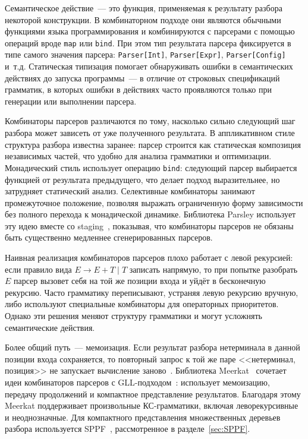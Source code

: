 Семантическое действие~--- это функция, применяемая к результату разбора некоторой конструкции. В комбинаторном подходе они являются обычными функциями языка программирования и комбинируются с парсерами с помощью операций вроде \texttt{map} или \texttt{bind}. При этом тип результата парсера фиксируется в типе самого значения парсера: \texttt{Parser[Int]}, \texttt{Parser[Expr]}, \texttt{Parser[Config]} и~т.д. Статическая типизация помогает обнаруживать ошибки в семантических действиях до запуска программы~--- в отличие от строковых спецификаций грамматик, в которых ошибки в действиях часто проявляются только при генерации или выполнении парсера.

Комбинаторы парсеров различаются по тому, насколько сильно следующий шаг разбора может зависеть от уже полученного результата. В аппликативном стиле структура разбора известна заранее: парсер строится как статическая композиция независимых частей, что удобно для анализа грамматики и оптимизации. Монадический стиль использует операцию \texttt{bind}: следующий парсер выбирается функцией от результата предыдущего, что делает подход выразительнее, но затрудняет статический анализ. Селективные комбинаторы занимают промежуточное положение, позволяя выражать ограниченную форму зависимости без полного перехода к монадической динамике. Библиотека Parsley использует эту идею вместе со staging~, показывая, что комбинаторы парсеров не обязаны быть существенно медленнее сгенерированных парсеров.

Наивная реализация комбинаторов парсеров плохо работает с левой рекурсией: если правило вида $E \to E + T \mid T$ записать напрямую, то при попытке разобрать $E$ парсер вызовет себя на той же позиции входа и уйдёт в бесконечную рекурсию. Часто грамматику переписывают, устраняя левую рекурсию вручную, либо используют специальные комбинаторы для операторных приоритетов. Однако эти решения меняют структуру грамматики и могут усложнять семантические действия.

Более общий путь~--- мемоизация. Если результат разбора нетерминала в данной позиции входа сохраняется, то повторный запрос к той же паре <<нетерминал, позиция>> не запускает вычисление заново~. Библиотека Meerkat~ сочетает идеи комбинаторов парсеров с GLL-подходом~: использует мемоизацию, передачу продолжений и компактное представление результатов. Благодаря этому Meerkat поддерживает произвольные КС-грамматики, включая леворекурсивные и неоднозначные. Для компактного представления множественных деревьев разбора используется SPPF~, рассмотренное в разделе~\ref{sec:SPPF}.

